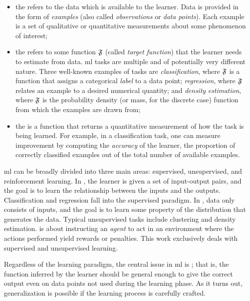 \begin{itemize}
    \item the  refers to the data which is available to the learner. Data is provided in the form of \emph{examples} (also called \emph{observations} or \emph{data points}). Each example is a set of qualitative or quantitative measurements about some phenomenon of interest;
    \item the  refers to some function $\mathfrak{F}$ (called \emph{target function}) that the learner needs to estimate from data. \gls{ml} tasks are multiple and of potentially very different nature. Three well-known examples of tasks are \emph{classification}, where $\mathfrak{F}$ is a function that assigns a categorical \emph{label} to a data point; \emph{regression}, where $\mathfrak{F}$ relates an example to a desired numerical quantity; and \emph{density estimation}, where $\mathfrak{F}$ is the probability density (or mass, for the discrete case) function from which the examples are drawn from;
    \item the  is a function that returns a quantitative measurement of how  the task is being learned. For example, in a classification task, one can measure improvement by computing the \emph{accuracy} of the learner, \ie the proportion of correctly classified examples out of the total number of available examples.
\end{itemize}

\gls{ml} can be broadly divided into three main areas: supervised, unsupervised, and reinforcement learning. In , the learner is given a set of input-output pairs, and the goal is to learn the relationship between the inputs and the outputs. Classification and regression fall into the supervised paradigm. In , data only consists of inputs, and the goal is to learn some property of the distribution that generates the data. Typical unsupervised tasks include clustering and density estimation.  \citep{sutton1998rl} is about instructing an \emph{agent} to act in an environment where the actions performed yield rewards or penalties. This work exclusively deals with supervised and unsupervised learning.

Regardless of the learning paradigm, the central issue in \gls{ml} is ; that is, the function inferred by the learner should be general enough to give the correct output even on data points not used during the learning phase. As it turns out, generalization is possible if the learning process is carefully crafted.


